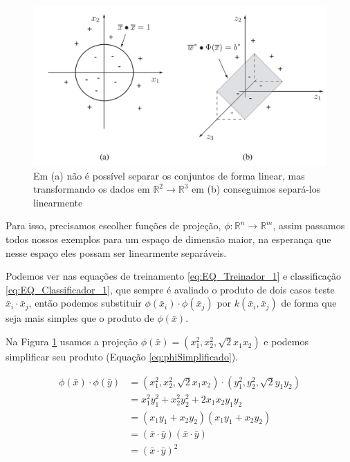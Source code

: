 \begin{figure}
  \centering
  \includegraphics[width=1\textwidth]{imagens/svm_5.png}
  \caption{Em (a) não é possível separar os conjuntos de forma linear, mas transformando os dados em $\mathbb{R}^2\rightarrow \mathbb{R}^3$ em (b) conseguimos separá-los linearmente \cite{art:LIVRO_SVM}}
  \label{fig:LABEL_FIG_5}
\end{figure}

Para isso, precisamos escolher funções de projeção, $\phi:\mathbb{R}^n\rightarrow\mathbb{R}^m$, assim passamos todos nossos exemplos para um espaço de dimensão maior, na esperança que nesse espaço eles possam ser linearmente separáveis.

Podemos ver nas equações de treinamento \ref{eq:EQ_Treinador_1} e classificação \ref{eq:EQ_Classificador_1}, que sempre é avaliado o produto de dois casos teste $\bar{x}_i\cdot\bar{x}_j$, então podemos substituir $\phi(\bar{x}_i) \cdot \phi ( \bar{x}_j )$ por $k(\bar{x}_i,\bar{x}_j)$ de forma que   seja mais simples que o produto de $\phi(\bar{x})$.

Na Figura \ref{fig:LABEL_FIG_5} usamos a projeção $\phi(\bar{x})=(x_1^2,x_2^2,\sqrt{2}x_1x_2)$ e podemos simplificar seu produto (Equação \ref{eq:phiSimplificado}).

\begin{equation} \label{eq:phiSimplificado}
\begin{split}
\phi(\bar{x})\cdot \phi(\bar{y}) &= (x_1^2,x_2^2,\sqrt{2}x_1x_2) \cdot (y_1^2,y_2^2,\sqrt{2}y_1y_2) \\
&=x_1^2y_1^2+x_2^2y_2^2+2x_1x_2y_1y_2 \\
&=(x_1y_1+x_2y_2)(x_1y_1+x_2y_2) \\
&=(\bar{x}\cdot\bar{y})(\bar{x}\cdot\bar{y}) \\
&=(\bar{x}\cdot\bar{y})^2
\end{split}
\end{equation}

